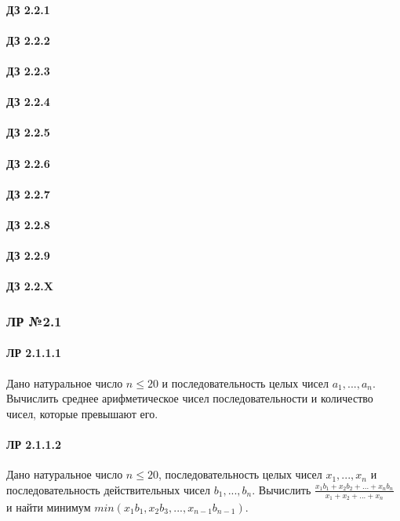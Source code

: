 \documentclass[12pt,a4paper]{report}
\begin{document}
\paragraph*{ДЗ 2.2.1}
\paragraph*{ДЗ 2.2.2}
\paragraph*{ДЗ 2.2.3}
\paragraph*{ДЗ 2.2.4}
\paragraph*{ДЗ 2.2.5}
\paragraph*{ДЗ 2.2.6}
\paragraph*{ДЗ 2.2.7}
\paragraph*{ДЗ 2.2.8}
\paragraph*{ДЗ 2.2.9}
\paragraph*{ДЗ 2.2.X}

\clearpage
\subsubsection*{ЛР №2.1}
\paragraph*{ЛР 2.1.1.1} Дано натуральное число $n \le 20$ и последовательность целых чисел $a_1, ..., a_n$. Вычислить среднее арифметическое чисел последовательности и количество чисел, которые превышают его.
\paragraph*{ЛР 2.1.1.2} Дано натуральное число $n \le 20$, последовательность целых чисел $x_1, ..., x_n$ и последовательность действительных чисел $b_1, ..., b_n$. Вычислить $\frac { x_1 b_1 + x_2 b_2 + ... + x_n b_n} { x_1 + x_2 + ... + x_n }$ и найти минимум $min(x_1 b_1, x_2 b_3, ..., x_{n-1} b_{n-1})$.
\end{document}
